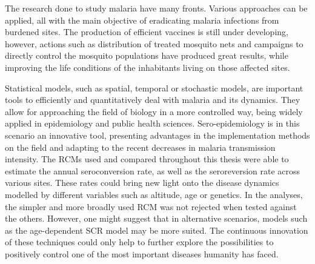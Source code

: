The research done to study malaria have many fronts.
Various approaches can be applied, all with the main objective of eradicating malaria infections from burdened sites.
The production of efficient vaccines is still under developing, however, actions such as distribution of treated mosquito nets and campaigns to directly control the mosquito populations have produced great results, while improving the life conditions of the inhabitants living on those affected sites.

Statistical models, such as spatial, temporal or stochastic models, are important tools to efficiently and quantitatively deal with malaria and its dynamics.
They allow for approaching the field of biology in a more controlled way, being widely applied in epidemiology and public health sciences.
Sero-epidemiology is in this scenario an innovative tool, presenting advantages in the implementation methods on the field and adapting to the recent decreases in malaria transmission intensity.
The RCMs used and compared throughout this thesis were able to estimate the annual seroconversion rate, as well as the seroreversion rate across various sites. These rates could bring new light onto the disease dynamics modelled by different variables such as altitude, age or genetics.
In the analyses, the simpler and more broadly used RCM was not rejected when tested against the others.
However, one might suggest that in alternative scenarios, models such as the age-dependent SCR model may be more suited.
The continuous innovation of these techniques could only help to further explore the possibilities to positively control one of the most important diseases humanity has faced.


